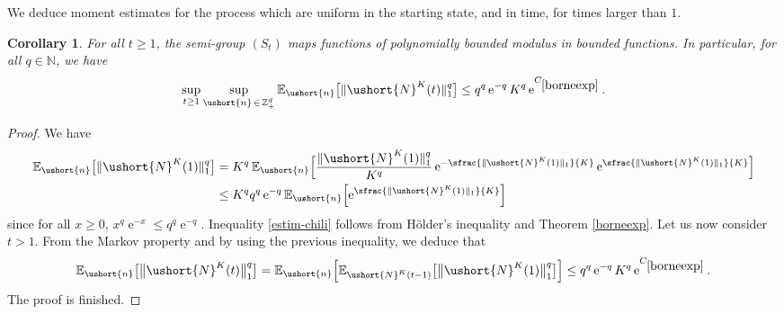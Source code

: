 \documentclass[JEP,XML,SOM,Unicode]{cedram}
\numberwithin{equation}{section}
\theoremstyle{plain}
\newtheorem{corollary}[theorem]{Corollary}
\theoremstyle{definition}
\newcommand{\cte}[1]{C_{\eqref{#1}}}
\newcommand{\E}{{\mathbb{E}}}
\newcommand{\zentiers}{{\mathbb{Z}}}
\newcommand{\integers}{\mathbb{N}}
\newcommand{\sdomaine}{{\zentiers}_+^d}
\newcommand{\vecn}{\ushort{n}}
\newcommand{\leproc}{\ushort{N}^{K}}
\newcommand{\sleproc}{\ushort{N}^{K}}
\newcommand{\e}{\operatorname{e}}
\begin{document}
We deduce moment estimates for the process which are uniform in the starting state, and in time, for times larger than $1$.
\begin{corollary}\label{auxbornees}
For all $t\ge1$, the semi-group $(S_{t})$ maps functions of polynomially bounded modulus in bounded
functions.
In particular, for all $q\in\integers$, we have
\begin{equation}
\label{estim-chili}
\sup_{t\geq 1}\sup_{\vecn\,\in\, \sdomaine} \E_{\vecn} \bigl[\|\leproc(t)\|_1^{q}\bigr]
\leq q^q \e^{-q} K^q \e^{\cte{borneexp}}.
\end{equation}
\end{corollary}
\begin{proof}
We have
\begin{align*}
\E_{\vecn} \bigl[\|\leproc(1)\|_1^{q}\bigr]
& = K^q\, \E_{\vecn}\Bigl[\frac{\|\leproc(1)\|_1^{q}}{K^q} \e^{-\sfrac{\|\sleproc(1)\|_{1}}{K}} \e^{\sfrac{\|\sleproc(1)\|_{1}}{K}}\Bigr]\\
& \leq K^q q^q \e^{-q} \E_{\vecn} \Bigl[\e^{\sfrac{\|\sleproc(1)\|_{1}}{K}}\Bigr]
\end{align*}
since for all $x\geq 0$, $x^q \e^{-x}\leq q^q \e^{-q}$.
Inequality \eqref{estim-chili} follows from Hölder's inequality and Theorem \ref{borneexp}.
Let us now consider $t> 1$. From the Markov property and by using the previous inequality, we deduce that
\[
\E_{\vecn}\bigl[\big\|\leproc(t)\big\|_1^{q}\bigr]
= \E_{\vecn}\Bigl[\E_{\sleproc(t-1)}\bigl[\big\|\leproc(1)\big\|^{q}_1\bigr]\Bigr]
\le q^q \e^{-q} K^q \e^{\cte{borneexp}}.
\]
The proof is finished.
\end{proof}
\end{document}
